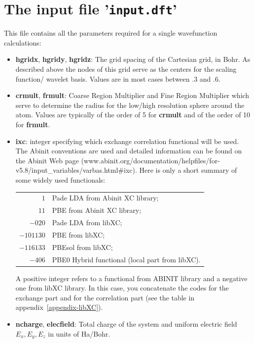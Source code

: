 \documentclass[a4paper,11pt]{report}
\begin{document}
\section{The input file '\texttt{input.dft}'}
This file contains all the parameters required for a single wavefunction calculations:
\begin{itemize}
\item {\bf hgridx}, {\bf hgridy}, {\bf hgridz}: The grid spacing of the Cartesian grid, in Bohr. As 
       described above the nodes of this grid serve as the centers for the scaling function/ wavelet basis. 
       Values are in most cases between $.3$ and $.6$.

\item {\bf crmult}, {\bf frmult}: Coarse Region Multiplier and Fine Region Multiplier which serve to determine the radius
      for the low/high resolution sphere around the atom. 
      Values are typically of the order of 5 for {\bf crmult} and of the order of 10 for  {\bf frmult}.
\item {\bf ixc}: integer specifying which exchange correlation functional will be used. The Abinit conventions are 
      used and detailed information can be found on the Abinit Web page 
      (www.abinit.org/documentation/helpfiles/for-v5.8/in\-put\_variables/varbas.html\#ixc). 
      Here is only a short summary of some wide\-ly used functionals:\\
      \begin{tabular}{rl}
      {$1$}       & Pade LDA from Abinit XC library;\\
      {$11$}      & PBE from Abinit XC library;\\
      {$-020$}    & Pade LDA from libXC;\\
      {$-101130$} & PBE from libXC;\\
      {$-116133$} & PBEsol from libXC; \\ 
      {$-406$}    & PBE0 Hybrid functional (local part from libXC).
      \end{tabular}
      A positive integer refers to a functional from ABINIT library and a negative one from libXC
      library. In this case, you concatenate the codes for the exchange part and for the correlation part
      (see the table in appendix~\ref{appendix-libXC}).
\item {\bf ncharge}, {\bf elecfield}: Total charge of the system and uniform electric field $E_x,E_y,E_z$ in units of Ha/Bohr. 

\end{itemize}
\end{document}
